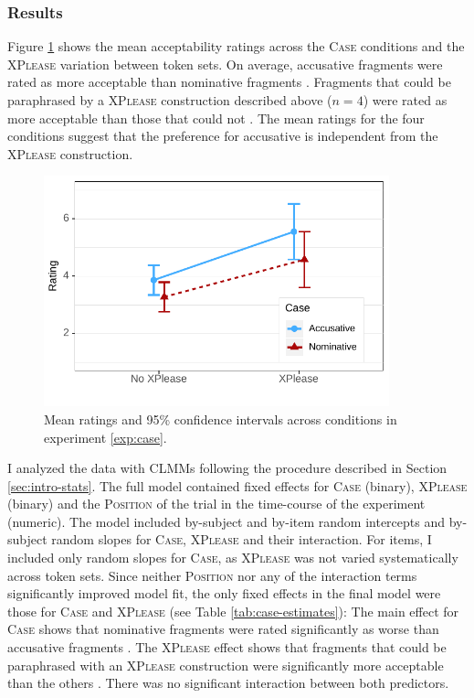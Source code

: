 \subsubsection{Results}\label{sec:fragments-case-rating-results}

Figure \ref{fig:case-estimates} shows the mean acceptability ratings across the \textsc{Case} conditions and the \textsc{XPlease} variation between token sets. On average, accusative fragments  were rated as more acceptable than nominative fragments . Fragments that could be paraphrased by a \textsc{XPlease} construction described above ($n = 4$) were rated as more acceptable  than those that could not . The mean ratings for the four conditions suggest that the preference for accusative is independent from the \textsc{XPlease} construction.

\begin{figure}[t]
\includegraphics[width=10cm]{figures/ex1_case_estimates}
 \caption{Mean ratings and 95\% confidence intervals across conditions in experiment \ref{exp:case}. \label{fig:case-estimates}}
\end{figure}

I analyzed the data with CLMMs following the procedure described in Section \ref{sec:intro-stats}.
The full model contained fixed effects for \textsc{Case} (binary), \textsc{XPlease} (binary) and the \textsc{Position} of the trial in the time-course of the experiment (numeric). The model included by-subject and by-item random intercepts and by-subject random slopes for \textsc{Case}, \textsc{XPlease} and their interaction. For items, I included only random slopes for \textsc{Case}, as \textsc{XPlease} was not varied systematically across token sets. Since neither \textsc{Position} nor any of the interaction terms significantly improved model fit, the only fixed effects in the final model were those for \textsc{Case} and \textsc{XPlease} (see Table \ref{tab:case-estimates}): The main effect for \textsc{Case} shows that nominative fragments were rated significantly as worse than accusative fragments . The \textsc{XPlease} effect shows that fragments that could be paraphrased with an \textsc{XPlease} construction were significantly more acceptable than the others . There was no significant interaction between both predictors.

